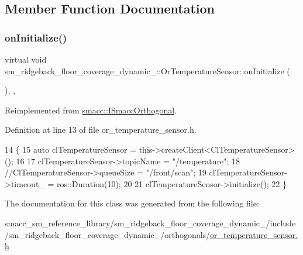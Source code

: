 \subsection{Member Function Documentation}
\mbox{\label{classsm__ridgeback__floor__coverage__dynamic__1_1_1OrTemperatureSensor_a492e0aa0c05b86c10458997a8367a42b}} 
\subsubsection{\texorpdfstring{on\+Initialize()}{onInitialize()}}
{\footnotesize\ttfamily virtual void sm\+\_\+ridgeback\+\_\+floor\+\_\+coverage\+\_\+dynamic\+\_\+::\+Or\+Temperature\+Sensor\+::on\+Initialize (\begin{DoxyParamCaption}{ }\end{DoxyParamCaption})\hspace{0.3cm}{\ttfamily [inline]}, {\ttfamily [override]}, {\ttfamily [virtual]}}



Reimplemented from \hyperlink{classsmacc_1_1ISmaccOrthogonal_a6bb31c620cb64dd7b8417f8705c79c7a}{smacc\+::\+I\+Smacc\+Orthogonal}.



Definition at line 13 of file or\+\_\+temperature\+\_\+sensor.\+h.


\begin{DoxyCode}
14     \{
15         \textcolor{keyword}{auto} clTemperatureSensor = this->createClient<ClTemperatureSensor>();
16 
17         clTemperatureSensor->topicName = \textcolor{stringliteral}{"/temperature"};
18         \textcolor{comment}{//ClTemperatureSensor->queueSize = "/front/scan";}
19         clTemperatureSensor->timeout\_ = ros::Duration(10);
20 
21         clTemperatureSensor->initialize();
22     \}
\end{DoxyCode}


The documentation for this class was generated from the following file\+:\begin{DoxyCompactItemize}
\item 
smacc\+\_\+sm\+\_\+reference\+\_\+library/sm\+\_\+ridgeback\+\_\+floor\+\_\+coverage\+\_\+dynamic\+\_/include/sm\+\_\+ridgeback\+\_\+floor\+\_\+coverage\+\_\+dynamic\+\_/orthogonals/\hyperlink{sm__ridgeback__floor__coverage__dynamic__1_2include_2sm__ridgeback__floor__coverage__dynamic__1_aa637d75540cec776ef5bb804a652c0a}{or\+\_\+temperature\+\_\+sensor.\+h}\end{DoxyCompactItemize}
